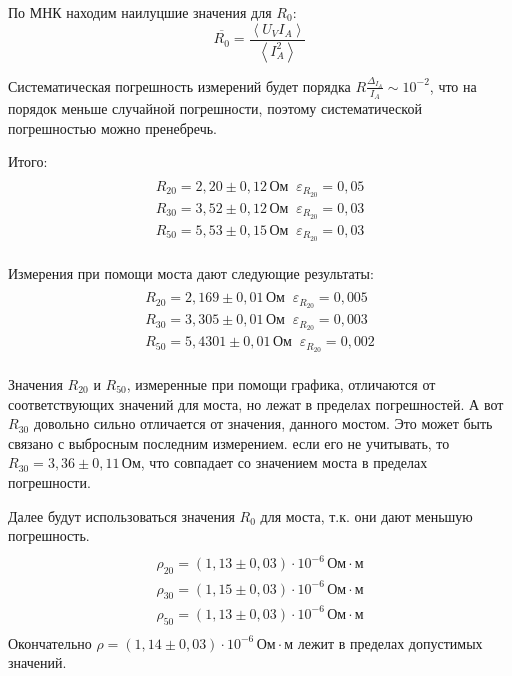 По МНК находим наилуцшие значения для $R_0$:
\[\overline{R_0}=\frac{\left\langle U_VI_A\right\rangle}{\left\langle I_A^2\right\rangle}\]

Систематическая погрешность измерений будет порядка $R\frac{\Delta_{I_A}}{I_A}\sim 10^{-2}$, что на порядок меньше случайной погрешности,
поэтому систематической погрешностью можно пренебречь.

Итого:
\begin{multline*}
    \\
    R_{20}=2{,}20\pm 0{,}12\,\text{Ом}\;\;\varepsilon_{R_{20}}=0{,}05\\
    R_{30}=3{,}52\pm 0{,}12\,\text{Ом}\;\;\varepsilon_{R_{20}}=0{,}03\\
    R_{50}=5{,}53\pm 0{,}15\,\text{Ом}\;\;\varepsilon_{R_{20}}=0{,}03\\
\end{multline*}

Измерения при помощи моста дают следующие результаты:
\begin{multline*}
    \\
    R_{20}=2{,}169\pm 0{,}01\,\text{Ом}\;\;\varepsilon_{R_{20}}=0{,}005\\
    R_{30}=3{,}305\pm 0{,}01\,\text{Ом}\;\;\varepsilon_{R_{20}}=0{,}003\\
    R_{50}=5{,}4301\pm 0{,}01\,\text{Ом}\;\;\varepsilon_{R_{20}}=0{,}002\\
\end{multline*}

Значения $R_{20}$ и $R_{50}$, измеренные при помощи графика, отличаются от соответствующих значений для моста,
но лежат в пределах погрешностей. А вот $R_{30}$ довольно сильно отличается от значения, данного мостом. Это
может быть связано с выбросным последним измерением. если его не учитывать, то $R_{30}=3{,}36\pm0{,}11\,\text{Ом}$,
что совпадает со значением моста в пределах погрешности.

Далее будут использоваться значения $R_0$ для моста, т.к. они дают меньшую погрешность.
\begin{multline*}
    \\
    \rho_{20}=\left(1{,}13\pm 0{,}03\right)\cdot 10^{-6}\,\text{Ом}\cdot\text{м}\\
    \rho_{30}=\left(1{,}15\pm 0{,}03\right)\cdot 10^{-6}\,\text{Ом}\cdot\text{м}\\
    \rho_{50}=\left(1{,}13\pm 0{,}03\right)\cdot 10^{-6}\,\text{Ом}\cdot\text{м}\\
\end{multline*}
Окончательно $\rho=\left(1{,}14\pm 0{,}03\right)\cdot 10^{-6}\,\text{Ом}\cdot\text{м}$ лежит в пределах допустимых значений.

